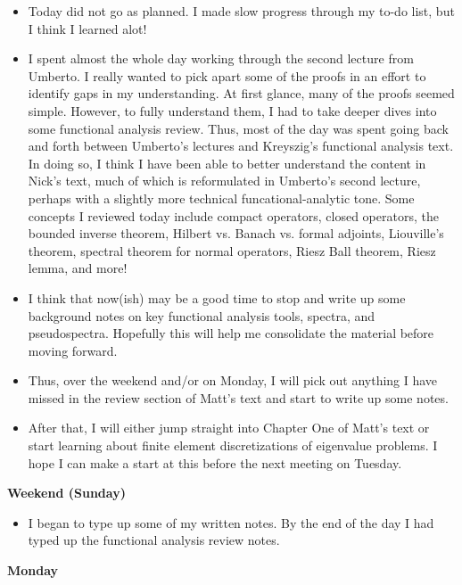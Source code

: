 \documentclass[12pt,a4paper]{article}
\begin{document}
    \begin{itemize}
        \item Today did not go as planned. I made slow progress through my to-do list, but I think I learned alot!
        \item I spent almost the whole day working through the second lecture from Umberto. I really wanted to pick apart some of the proofs in an effort to identify gaps in my understanding. At first glance, many of the proofs seemed simple. However, to fully understand them, I had to take deeper dives into some functional analysis review.  Thus, most of the day was spent going back and forth between Umberto's lectures and Kreyszig's functional analysis text. In doing so, I think I have been able to better understand the content in Nick's text, much of which is reformulated in Umberto's second lecture, perhaps with a slightly more technical funcational-analytic tone. Some concepts I reviewed today include compact operators, closed operators, the bounded inverse theorem, Hilbert vs. Banach vs. formal adjoints, Liouville's theorem, spectral theorem for normal operators, Riesz Ball theorem, Riesz lemma, and more! 
        \item I think that now(ish) may be a good time to stop and write up some background notes on key functional analysis tools, spectra, and pseudospectra. Hopefully this will help me consolidate the material before moving forward. 
        \item Thus, over the weekend and/or on Monday, I will pick out anything I have missed in the review section of Matt's text and start to write up some notes. 
        \item After that, I will either jump straight into Chapter One of Matt's text or start learning about finite element discretizations of eigenvalue problems. I hope I can make a start at this before the next meeting on Tuesday.
    \end{itemize}


\textbf{Weekend (Sunday)}
    
    \begin{itemize}
        \item I began to type up some of my written notes. By the end of the day I had typed up the functional analysis review notes.
    \end{itemize}

\textbf{Monday}
    
\end{document}
